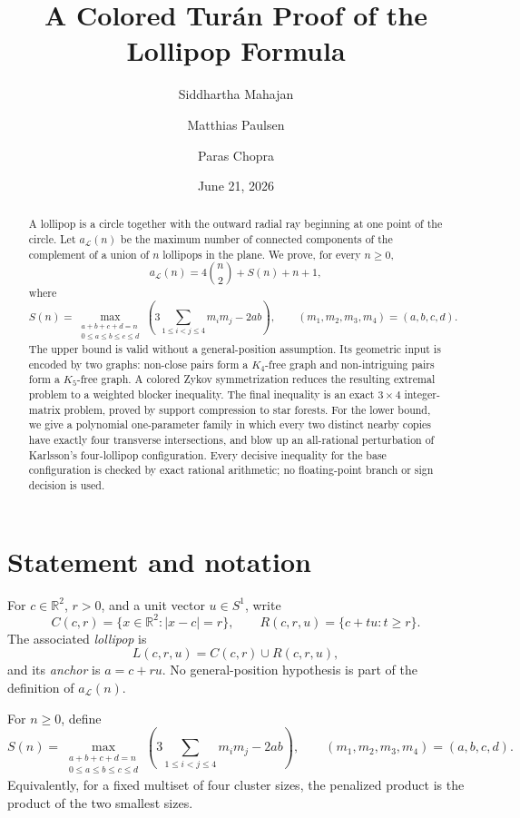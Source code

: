 \documentclass[11pt]{article}
\theoremstyle{plain}
\theoremstyle{definition}
\theoremstyle{remark}
\newcommand{\Lop}{\mathcal L}
\newcommand{\R}{\mathbb R}
\newcommand{\1}{\mathbf 1}
\begin{document}
\title{A Colored Tur\'an Proof of the Lollipop Formula}
\author{Siddhartha Mahajan \and Matthias Paulsen \and Paras Chopra}
\date{June 21, 2026}
\maketitle

\begin{abstract}
A lollipop is a circle together with the outward radial ray beginning at one
point of the circle.  Let $a_{\Lop}(n)$ be the maximum number of connected
components of the complement of a union of $n$ lollipops in the plane.  We
prove, for every $n\geq 0$,
\[
 a_{\Lop}(n)=4\binom n2+S(n)+n+1,
\]
where
\[
 S(n)=\max_{\substack{a+b+c+d=n\\0\leq a\leq b\leq c\leq d}}
 \left(3\sum_{1\leq i<j\leq4}m_i m_j-2ab\right),
 \qquad (m_1,m_2,m_3,m_4)=(a,b,c,d).
\]
The upper bound is valid without a general-position assumption.  Its
geometric input is encoded by two graphs: non-close pairs form a $K_4$-free
graph and non-intriguing pairs form a $K_5$-free graph.  A colored Zykov
symmetrization reduces the resulting extremal problem to a weighted blocker
inequality.  The final inequality is an exact $3\times4$ integer-matrix
problem, proved by support compression to star forests.  For the lower bound, we give a polynomial one-parameter family
in which every two distinct nearby copies have exactly four transverse
intersections, and blow up an all-rational perturbation of Karlsson's
four-lollipop configuration.  Every decisive inequality for the base
configuration is checked by exact rational arithmetic; no floating-point
branch or sign decision is used.
\end{abstract}

\section{Statement and notation}\label{sec:statement}

For $c\in\R^2$, $r>0$, and a unit vector $u\in S^1$, write
\[
 C(c,r)=\{x\in\R^2:|x-c|=r\},\qquad
 R(c,r,u)=\{c+tu:t\geq r\}.
\]
The associated \emph{lollipop} is
\[
 L(c,r,u)=C(c,r)\cup R(c,r,u),
\]
and its \emph{anchor} is $a=c+ru$.  No general-position hypothesis is part
of the definition of $a_{\Lop}(n)$.

For $n\geq0$, define
\begin{equation}\label{eq:Sdef}
 S(n)=\max_{\substack{a+b+c+d=n\\0\leq a\leq b\leq c\leq d}}
 \left(3\sum_{1\leq i<j\leq4}m_i m_j-2ab\right),
 \qquad (m_1,m_2,m_3,m_4)=(a,b,c,d).
\end{equation}
Equivalently, for a fixed multiset of four cluster sizes, the penalized
product is the product of the two smallest sizes.
\end{document}
